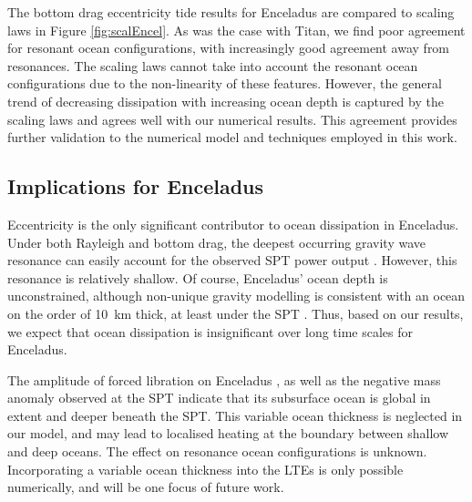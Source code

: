 The bottom drag eccentricity tide results for Enceladus are compared to \citet{chen2013tidal} scaling laws in Figure \ref{fig:scalEncel}. As was the case with Titan, we find poor agreement for resonant ocean configurations, with increasingly good agreement away from resonances. The scaling laws cannot take into account the resonant ocean configurations due to the non-linearity of these features. However, the general trend of decreasing dissipation with increasing ocean depth is captured by the scaling laws and agrees well with our numerical results. This agreement provides further validation to the numerical model and techniques employed in this work.

\subsection{Implications for Enceladus}

Eccentricity is the only significant contributor to ocean dissipation in Enceladus. Under both Rayleigh and bottom drag, the deepest occurring gravity wave resonance can easily account for the observed SPT power output \citep{spencer2006cassini,howett2011high,spencer2013new}. However, this resonance is relatively shallow. Of course, Enceladus' ocean depth is unconstrained, although non-unique gravity modelling is consistent with an ocean on the order of \SI{10}{\kilo\metre} thick, at least under the SPT \citep{iess2014gravity}. Thus, based on our results, we expect that ocean dissipation is insignificant over long time scales for Enceladus. 


The amplitude of forced libration on Enceladus \citep{thomas2015enceladus}, as well as the negative mass anomaly observed at the SPT \citep{iess2014gravity, mckinnon2015effect} indicate that its subsurface ocean is global in extent and deeper beneath the SPT. This variable ocean thickness is neglected in our model, and may lead to localised heating at the boundary between shallow and deep oceans. The effect on resonance ocean configurations is unknown. Incorporating a variable ocean thickness into the LTEs is only possible numerically, and will be one focus of future work.
